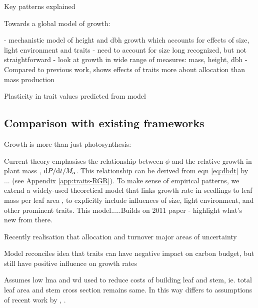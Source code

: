 \documentclass[a4paper,11pt]{article}
\begin{document}
Key patterns explained


Towards a global model of growth:

- mechanistic model of height and dbh growth which accounts for effects
  of size, light environment and traits
- need to account for size long recognized, but not straightforward
- look at growth in wide range of measures: mass, height, dbh
- Compared to previous work, shows effects of traits more about
  allocation than mass production

Plasticity in trait values predicted from model

\subsection{Comparison with existing frameworks}

Growth is more than just photosynthesis:

Current theory emphasises the relationship between $\phi$ and the relative growth in plant mass \citep{Lambers-1992, Cornelissen-1996, Wright-2000, Enquist-2007}, ${\rm d}P / {\rm d}t / M_{\rm a}$. This relationship can be derived from eqn \ref{eq:dbdt}  by ... (see Appendix \ref{app:traits-RGR}). To make sense of empirical patterns, we extend a widely-used theoretical model that links growth rate in seedlings to leaf mass per leaf area \citep{Lambers-1992, Wright-2000}, to explicitly include influences of size, light environment, and other prominent traits. This model.....Builds on 2011 paper - highlight what's new from there.

Recently realisation that allocation and turnover major areas of uncertainty

Model reconciles idea that traits can have negative impact on carbon budget, but still have positive influence on growth rates


Assumes low lma and wd used to reduce costs of building leaf and stem, ie. total leaf area and stem cross section remains same. In this way differs to assumptions of recent work by \citep{Anten-2010}, \citep{Larjavaara-2010}.
\end{document}
